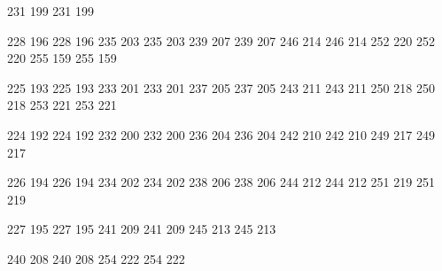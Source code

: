 

\startmapping[texnansi]

 231 199  231 199

 228 196  228 196
 235 203  235 203
 239 207  239 207
 246 214  246 214
 252 220  252 220
 255 159  255 159

 225 193  225 193
 233 201  233 201
 237 205  237 205
 243 211  243 211
 250 218  250 218
 253 221  253 221

 224 192  224 192
 232 200  232 200
 236 204  236 204
 242 210  242 210
 249 217  249 217

 226 194  226 194
 234 202  234 202
 238 206  238 206
 244 212  244 212
 251 219  251 219

 227 195  227 195
 241 209  241 209
 245 213  245 213

 240 208  240 208
 254 222  254 222



